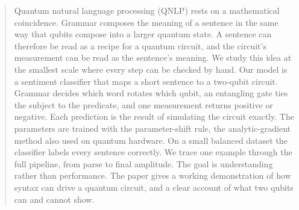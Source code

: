 \documentclass{article}
\begin{document}

\printAffiliationsAndNotice{\icmlEqualContribution}

\makeatletter\gdef{}\makeatother

\begin{abstract}
  Quantum natural language processing (QNLP) rests on a mathematical
  coincidence. Grammar composes the meaning of a sentence in the same way that
  qubits compose into a larger quantum state. A sentence can therefore be read
  as a recipe for a quantum circuit, and the circuit's measurement can be read
  as the sentence's meaning. We study this idea at the smallest scale where
  every step can be checked by hand. Our model is a sentiment classifier that
  maps a short sentence to a two-qubit circuit. Grammar decides which word
  rotates which qubit, an entangling gate ties the subject to the predicate, and
  one measurement returns positive or negative. Each prediction is the result of
  simulating the circuit exactly. The parameters are trained with the
  parameter-shift rule, the analytic-gradient method also used on quantum
  hardware. On a small balanced dataset the classifier labels every sentence
  correctly. We trace one example through the full pipeline, from parse to final
  amplitude. The goal is understanding rather than performance. The paper gives a
  working demonstration of how syntax can drive a quantum circuit, and a clear
  account of what two qubits can and cannot show.
\end{abstract}
\end{document}

